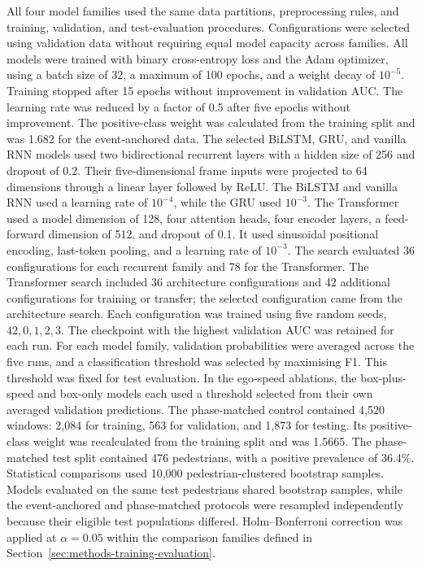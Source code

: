 \documentclass[mti,article,submit,moreauthors]{Definitions/mdpi}
\begin{document}
All four model families used the same data partitions, preprocessing rules, and training, validation, and test-evaluation procedures. Configurations were selected using validation data without requiring equal model capacity across families. All models were trained with binary cross-entropy loss and the Adam optimizer, using a batch size of 32, a maximum of 100 epochs, and a weight decay of $10^{-5}$. Training stopped after 15 epochs without improvement in validation AUC. The learning rate was reduced by a factor of 0.5 after five epochs without improvement. The positive-class weight was calculated from the training split and was 1.682 for the event-anchored data. The selected BiLSTM, GRU, and vanilla RNN models used two bidirectional recurrent layers with a hidden size of 256 and dropout of 0.2. Their five-dimensional frame inputs were projected to 64 dimensions through a linear layer followed by ReLU. The BiLSTM and vanilla RNN used a learning rate of $10^{-4}$, while the GRU used $10^{-3}$. The Transformer used a model dimension of 128, four attention heads, four encoder layers, a feed-forward dimension of 512, and dropout of 0.1. It used sinusoidal positional encoding, last-token pooling, and a learning rate of $10^{-3}$. The search evaluated 36 configurations for each recurrent family and 78 for the Transformer. The Transformer search included 36 architecture configurations and 42 additional configurations for training or transfer; the selected configuration came from the architecture search. Each configuration was trained using five random seeds, ${42,0,1,2,3}$. The checkpoint with the highest validation AUC was retained for each run. For each model family, validation probabilities were averaged across the five runs, and a classification threshold was selected by maximising F1. This threshold was fixed for test evaluation. In the ego-speed ablations, the box-plus-speed and box-only models each used a threshold selected from their own averaged validation predictions. The phase-matched control contained 4,520 windows: 2,084 for training, 563 for validation, and 1,873 for testing. Its positive-class weight was recalculated from the training split and was 1.5665. The phase-matched test split contained 476 pedestrians, with a positive prevalence of 36.4\%. Statistical comparisons used 10,000 pedestrian-clustered bootstrap samples. Models evaluated on the same test pedestrians shared bootstrap samples, while the event-anchored and phase-matched protocols were resampled independently because their eligible test populations differed. Holm--Bonferroni correction was applied at $\alpha=0.05$ within the comparison families defined in Section~\ref{sec:methods-training-evaluation}.
\end{document}
